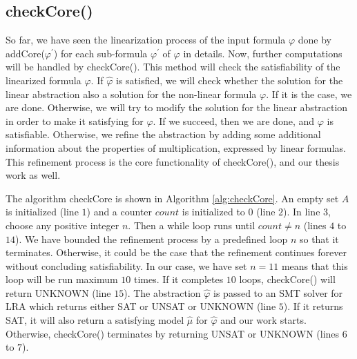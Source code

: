 \subsection{checkCore()}
\label{subsec:checkCore}
\begin{sloppypar}
So far, we have seen the linearization process of the input formula $\varphi$ done by addCore($\varphi^\prime$) for each sub-formula $\varphi^\prime$ of $\varphi$ in details.
Now, further computations will be handled by checkCore().
This method will check the satisfiability of the linearized formula $\hat{\varphi}$.
If $\hat{\varphi}$ is satisfied, we will check whether the solution for the linear abstraction also a solution for the non-linear formula $\varphi$.
If it is the case, we are done.
Otherwise, we will try to modify the solution for the linear abstraction in order to make it satisfying for $\varphi$.
If we succeed, then we are done, and $\varphi$ is satisfiable.
Otherwise, we refine the abstraction by adding some additional information about the properties of multiplication, expressed by linear formulas.
This refinement process is the core functionality of checkCore(), and our thesis work as well.\newline
\end{sloppypar}

\noindent The algorithm checkCore is shown in Algorithm \ref{alg:checkCore}.
An empty set $A$ is initialized (line $1$) and a counter $count$ is initialized to 0 (line $2$).
In line $3$, choose any positive integer $n$.
Then a while loop runs until $count \neq n$ (lines $4$ to $14$).
We have bounded the refinement process by a predefined loop $n$ so that it terminates.
Otherwise, it could be the case that the refinement continues forever without concluding satisfiability.
In our case, we have set $n = 11$ means that this loop will be run maximum $10$ times.
If it completes $10$ loops, checkCore() will return UNKNOWN (line $15$).
The abstraction $\hat{\varphi}$ is passed to an SMT solver for LRA which returns either SAT or UNSAT or UNKNOWN (line $5$).
If it returns SAT, it will also return a satisfying model $\hat{\mu}$ for $\hat{\varphi}$ and our work starts.
Otherwise, checkCore() terminates by returning UNSAT or UNKNOWN (lines $6$ to $7$).\newline

